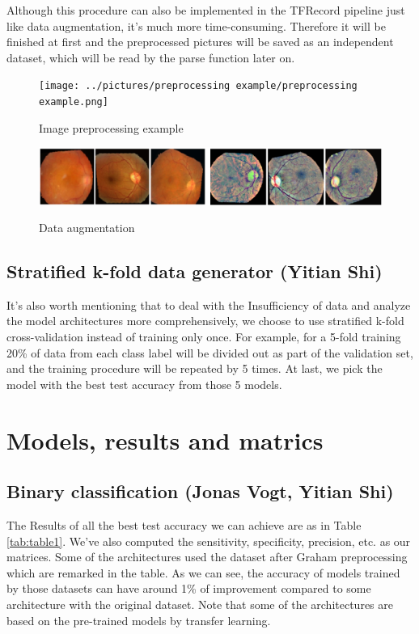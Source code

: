 \documentclass{article}
\begin{document}
Although this procedure can also be implemented in the TFRecord pipeline just like data augmentation, it's much more time-consuming. Therefore it will be finished at first and the preprocessed pictures will be saved as an independent dataset, which will be read by the parse function later on.
\begin{figure}
\centering
{
\texttt{[image: ../pictures/preprocessing example/preprocessing example.png]}
}
\caption{Image preprocessing example}
\label{fig:fig2}
\end{figure}
\begin{figure}
\centering
{
\includegraphics[scale=0.5]{../pictures/preprocessing example/augmentation.png}
}
\caption{Data augmentation}
\label{fig:fig3}
\end{figure}

\subsection{Stratified k-fold data generator (Yitian Shi)}
It's also worth mentioning that to deal with the Insufficiency of data and analyze the model architectures more comprehensively, we choose to use stratified k-fold cross-validation instead of training only once. For example, for a 5-fold training 20\% of data from each class label will be divided out as part of the validation set, and the training procedure will be repeated by 5 times. At last, we pick the model with the best test accuracy from those 5 models. 

\section{Models, results and matrics}
\label{sec:model}

\subsection{Binary classification (Jonas Vogt, Yitian Shi)}
The Results of all the best test accuracy we can achieve are as in Table \ref{tab:table1}. We've also computed the sensitivity, specificity, precision, etc. as our matrices. Some of the architectures used the dataset after Graham preprocessing which are remarked in the table. As we can see, the accuracy of models trained by those datasets can have around 1\% of improvement compared to some architecture with the original dataset. Note that some of the architectures are based on the pre-trained models by transfer learning.
\end{document}
